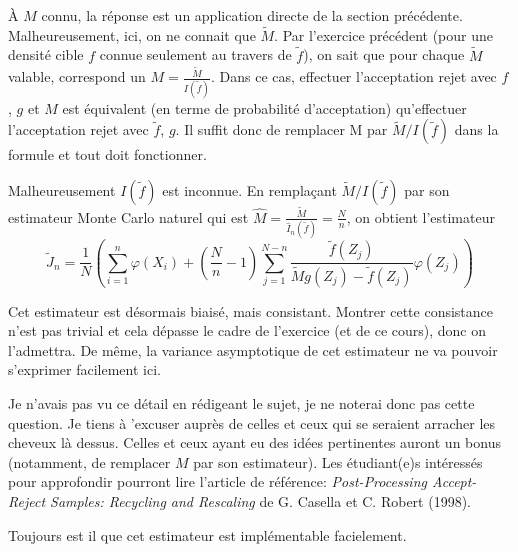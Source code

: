 \documentclass[]{article}
\newenvironment{Correction}%
  { \vspace{\baselineskip}\begin{mdframed}[backgroundcolor=my_green]}%
  {\end{mdframed}}
\begin{document}
\begin{Correction}
À $M$ connu, la réponse est un application directe de la section précédente. Malheureusement, ici, on ne connait que $\tilde{M}$. Par l'exercice précédent (pour une densité cible $f$ connue seulement au travers de $\tilde{f}$), on sait que pour chaque $\tilde{M}$ valable, correspond un $M = \frac{\tilde{M}}{I(\tilde{f})}$. Dans ce cas, effectuer l'acceptation rejet avec $f$, $g$ et $M$ est équivalent (en terme de probabilité d'acceptation) qu'effectuer l'acceptation rejet avec $\tilde{f}$, $g$. Il suffit donc de remplacer M par $\tilde{M} / I(\tilde{f})$ dans la formule et tout doit fonctionner.

Malheureusement $I(\tilde{f})$ est inconnue.
En remplaçant $\tilde{M} / I(\tilde{f})$ par son estimateur Monte Carlo naturel qui est $\hat{M} = \frac{\tilde{M}}{\hat{I}_n(\tilde{f})} = \frac{N}{n}$, on obtient l'estimateur 
$$\tilde{J}_n = \frac{1}{N} \left(\sum_{i = 1}^n \varphi(X_i) + (\frac{N}{n} - 1) \sum_{j = 1}^{N - n} \frac{\tilde{f}(Z_j)}{\tilde{M}g(Z_j) - \tilde{f} (Z_j)}\varphi(Z_j) \right)$$

Cet estimateur est désormais biaisé, mais consistant.
Montrer cette consistance n'est pas trivial et cela dépasse le cadre de l'exercice (et de ce cours), donc on l'admettra. De même, la variance asymptotique de cet estimateur ne va pouvoir s'exprimer facilement ici.

Je n'avais pas vu ce détail en rédigeant le sujet, je ne noterai donc pas cette question.
Je tiens à 'excuser auprès de celles et ceux qui se seraient arracher les cheveux là dessus. Celles et ceux ayant eu des idées pertinentes auront un bonus (notamment, de remplacer $M$ par son estimateur). Les étudiant(e)s intéressés pour approfondir pourront lire l'article de référence: \textit{Post-Processing Accept-Reject Samples: Recycling and Rescaling} de G. Casella et C. Robert (1998).

Toujours est il que cet estimateur est implémentable facielement.
\end{Correction}
\end{document}
